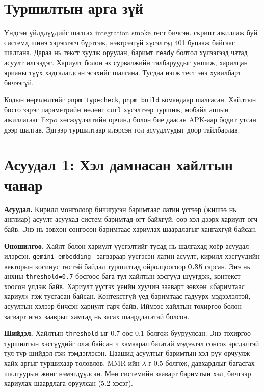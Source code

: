 \documentclass[../main.tex]{subfiles}
\begin{document}
\section{Туршилтын арга зүй}

Үндсэн үйлдлүүдийг шалгах integration smoke тест бичсэн.
 скрипт ажиллаж буй системд шинэ хэрэглэгч бүртгэж,
нэвтрээгүй хүсэлтэд 401 буцааж байгааг шалгана. Дараа нь текст хуулж
оруулан, баримт \texttt{ready} болтол хүлээгээд чатад асуулт илгээдэг.
Хариулт болон эх сурвалжийн талбаруудыг уншиж, харилцан ярианы түүх
хадгалагдсан эсэхийг шалгана. Тусдаа нэгж тест энэ хувилбарт бичээгүй.

Кодын өөрчлөлтийг \texttt{pnpm typecheck}, \texttt{pnpm build}
командаар шалгасан. Хайлтын босго зэрэг параметрийн нөлөөг \texttt{curl}
хүсэлтээр туршиж, мобайл аппын ажиллагааг Expo хөгжүүлэлтийн орчинд болон
бие даасан APK-аар бодит утсан дээр шалгав. Эдгээр туршилтаар илэрсэн гол
асуудлуудыг доор тайлбарлав.

\section{Асуудал 1: Хэл дамнасан хайлтын чанар}
\label{sec:problem-crosslingual}

\textbf{Асуудал.} Кирилл монголоор бичигдсэн баримтаас латин үсгээр (жишээ
нь англиар) асуулт асуухад систем баримтад огт байхгүй, өөр хэл дээрх
хариулт өгч байв. Энэ нь зөвхөн сонгосон баримтаас хариулах шаардлагыг
хангахгүй байсан.

\textbf{Оношилгоо.} Хайлт болон хариулт үүсгэлтийг тусад нь шалгахад
хоёр асуудал илэрсэн. \texttt{gemini-\allowbreak embedding-} загвараар үүсгэсэн
латин асуулт, кирилл хэсгүүдийн векторын косинус төстэй байдал туршилтад
ойролцоогоор \textbf{0.35} гарсан. Энэ нь анхны \texttt{threshold=0.7}
босгоос бага тул хайлтын хэсгүүд шүүгдэж, контекст хоосон үлдэж байв.
Хариулт үүсгэх үеийн хуучин зааварт зөвхөн «баримтаас хариул» гэж
тусгасан байсан. Контекстгүй үед баримтаас гадуурх мэдээлэлтэй, асуултын
хэлээр бичсэн хариулт гарч байв. Иймээс хайлтын тохиргоо болон загварт
өгөх зааврыг хамтад нь засах шаардлагатай болсон.

\textbf{Шийдэл.} Хайлтын \texttt{threshold}-ыг $0.7$-оос $0.1$ болгож
бууруулсан. Энэ тохиргоо туршилтын хэсгүүдийг олж байсан ч хамаарал
багатай мэдээлэл сонгох эрсдэлтэй тул түр шийдэл гэж тэмдэглэсэн.
Цаашид асуултыг баримтын хэл рүү орчуулж хайх аргыг туршихаар төлөвлөв.
MMR-ийн $\lambda$-г $0.5$ болгож, давхардлыг багасгах шалгуурын жинг
нэмэгдүүлсэн. Мөн системийн зааварт баримтын хэл, бичгээр хариулах
шаардлага оруулсан (5.2 хэсэг).
\end{document}
